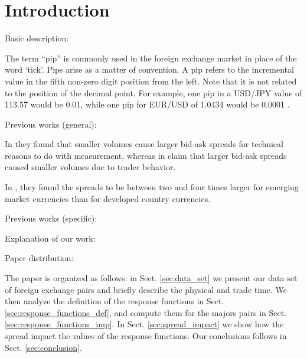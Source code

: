 \section{Introduction}\label{sec:introduction}

Basic description:

The term ``pip'' is commonly used in the foreign exchange market in place of the
word ‘tick’. Pips arise as a matter of convention.
A pip refers to the incremental value in the fifth non-zero digit
position from the left. Note that it is not related to the position of the
decimal point. For example, one pip in a USD/JPY value of 113.57 would be 0.01,
while one pip for EUR/USD of 1.0434 would be 0.0001 \cite{micro_eff}.


Previous works (general):

In \cite{micro_eff} they found that smaller volumes cause larger bid-ask
spreads for technical reasons to do with measurement, whereas in
\cite{eur_int_curr,eur_change_forex} claim that larger bid-ask spreads caused
smaller volumes due to trader behavior.

In \cite{curr_speculation}, they found the spreads to be between two and four
times larger for emerging market currencies than for developed country currencies.



Previous works (specific):






Explanation of our work:






Paper distribution:

The paper is organized as follows: in Sect. \ref{sec:data_set} we present our
data set of foreign exchange pairs and briefly describe the physical and trade time. We then
analyze the definition of the response functions in Sect.
\ref{sec:response_functions_def}, and compute them for the majors pairs in
Sect. \ref{sec:response_functions_imp}.
In Sect. \ref{sec:spread_impact} we show how the spread impact the values of the
response functions. Our conclusions follows in Sect. \ref{sec:conclusion}.